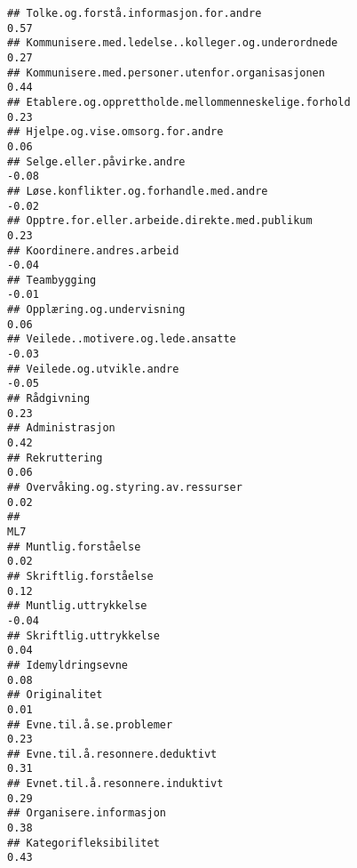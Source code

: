 \documentclass[
]{article}
\begin{document}
\begin{verbatim}
## Tolke.og.forstå.informasjon.for.andre                                             0.57
## Kommunisere.med.ledelse..kolleger.og.underordnede                                 0.27
## Kommunisere.med.personer.utenfor.organisasjonen                                   0.44
## Etablere.og.opprettholde.mellommenneskelige.forhold                               0.23
## Hjelpe.og.vise.omsorg.for.andre                                                   0.06
## Selge.eller.påvirke.andre                                                        -0.08
## Løse.konflikter.og.forhandle.med.andre                                           -0.02
## Opptre.for.eller.arbeide.direkte.med.publikum                                     0.23
## Koordinere.andres.arbeid                                                         -0.04
## Teambygging                                                                      -0.01
## Opplæring.og.undervisning                                                         0.06
## Veilede..motivere.og.lede.ansatte                                                -0.03
## Veilede.og.utvikle.andre                                                         -0.05
## Rådgivning                                                                        0.23
## Administrasjon                                                                    0.42
## Rekruttering                                                                      0.06
## Overvåking.og.styring.av.ressurser                                                0.02
##                                                                                    ML7
## Muntlig.forståelse                                                                0.02
## Skriftlig.forståelse                                                              0.12
## Muntlig.uttrykkelse                                                              -0.04
## Skriftlig.uttrykkelse                                                             0.04
## Idemyldringsevne                                                                  0.08
## Originalitet                                                                      0.01
## Evne.til.å.se.problemer                                                           0.23
## Evne.til.å.resonnere.deduktivt                                                    0.31
## Evnet.til.å.resonnere.induktivt                                                   0.29
## Organisere.informasjon                                                            0.38
## Kategorifleksibilitet                                                             0.43

\end{verbatim}
\end{document}
